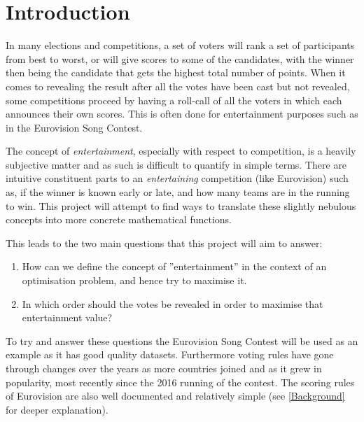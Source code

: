 \documentclass[12pt]{report}
\begin{document}
\section{Introduction}\label{Introduction}
In many elections and competitions, a set of voters will rank a set of participants from best to worst, or will give scores to some of the candidates, with the winner then being the candidate that gets the highest total number of points. When it comes to revealing the result after all the votes have been cast but not revealed, some competitions proceed by having a roll-call of all the voters in which each announces their own scores. This is often done for entertainment purposes such as in the Eurovision Song Contest.\cite{EurovisionVoting}

The concept of \textit{entertainment}, especially with respect to competition, is a heavily subjective matter and as such is difficult to quantify in simple terms. There are intuitive constituent parts to an \textit{entertaining} competition (like Eurovision) such as, if the winner is known early or late, and how many teams are in the running to win. This project will attempt to find ways to translate these slightly nebulous concepts into more concrete mathematical functions.  

This leads to the two main questions that this project will aim to answer:

\begin{enumerate}
\item How can we define the concept of ''entertainment'' in the context of an optimisation problem, and hence try to maximise it.
\item  In which order should the votes be revealed in order to maximise that entertainment value?
\end{enumerate}

To try and answer these questions the Eurovision Song Contest will be used as an example as it has good quality datasets. Furthermore voting rules have gone through changes over the years as more countries joined and as it grew in popularity, most recently since the 2016 running of the contest. The scoring rules of Eurovision are also well documented and relatively simple (see \ref{Background} for deeper explanation).
\end{document}
